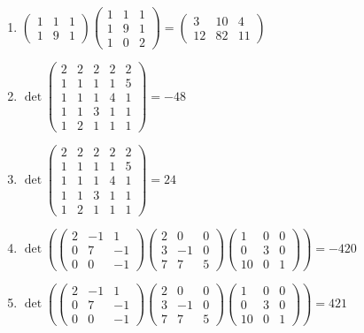 \documentclass[11pt,a4paper]{article}
\begin{document}
\begin{enumerate}
\item $\displaystyle \begin{pmatrix} 1 & 1 & 1 \\ 1 & 9 & 1 \end{pmatrix} \begin{pmatrix} 1 & 1 & 1 \\ 1 & 9 & 1 \\ 1 & 0 & 2 \end{pmatrix} = \begin{pmatrix} 3 & 10 & 4 \\ 12 & 82 & 11 \end{pmatrix}$
\item $\displaystyle \det \begin{pmatrix} 2 & 2 & 2 & 2 & 2 \\ 1 & 1 & 1 & 1 & 5 \\ 1 & 1 & 1 & 4 & 1 \\ 1 & 1 & 3 & 1 & 1 \\ 1 & 2 & 1 & 1 & 1 \end{pmatrix} = -48$
\item $\displaystyle \det \begin{pmatrix} 2 & 2 & 2 & 2 & 2 \\ 1 & 1 & 1 & 1 & 5 \\ 1 & 1 & 1 & 4 & 1 \\ 1 & 1 & 3 & 1 & 1 \\ 1 & 2 & 1 & 1 & 1 \end{pmatrix} = 24$
\item $\displaystyle \det\left( \begin{pmatrix} 2 & -1 & 1 \\ 0 & 7 & -1 \\ 0 & 0 & -1 \end{pmatrix} \begin{pmatrix} 2 & 0 & 0 \\ 3 & -1 & 0 \\ 7 & 7 & 5 \end{pmatrix} \begin{pmatrix} 1 & 0 & 0 \\ 0 & 3 & 0 \\ 10 & 0 & 1 \end{pmatrix} \right) = -420$
\item $\displaystyle \det\left( \begin{pmatrix} 2 & -1 & 1 \\ 0 & 7 & -1 \\ 0 & 0 & -1 \end{pmatrix} \begin{pmatrix} 2 & 0 & 0 \\ 3 & -1 & 0 \\ 7 & 7 & 5 \end{pmatrix} \begin{pmatrix} 1 & 0 & 0 \\ 0 & 3 & 0 \\ 10 & 0 & 1 \end{pmatrix} \right) = 421$

\end{enumerate}
\end{document}
